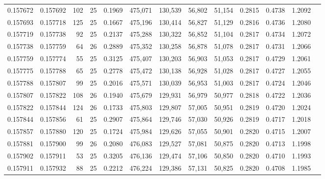 \begin{tabular}{rrrrrrrrrrrrr}
0.157672 & 0.157692 &   102 &  25 &                                     0.1969 & 475,071 & 130,539 &  56,802 &  51,154 & 0.2815 & 0.4738 & 1.2092 \\
0.157693 & 0.157718 &   125 &  25 &                                     0.1667 & 475,196 & 130,414 &  56,827 &  51,129 & 0.2816 & 0.4736 & 1.2080 \\
0.157719 & 0.157738 &    92 &  25 &                                     0.2137 & 475,288 & 130,322 &  56,852 &  51,104 & 0.2817 & 0.4734 & 1.2072 \\
0.157738 & 0.157759 &    64 &  26 &                                     0.2889 & 475,352 & 130,258 &  56,878 &  51,078 & 0.2817 & 0.4731 & 1.2066 \\
0.157759 & 0.157774 &    55 &  25 &                                     0.3125 & 475,407 & 130,203 &  56,903 &  51,053 & 0.2817 & 0.4729 & 1.2061 \\
0.157775 & 0.157788 &    65 &  25 &                                     0.2778 & 475,472 & 130,138 &  56,928 &  51,028 & 0.2817 & 0.4727 & 1.2055 \\
0.157788 & 0.157807 &    99 &  25 &                                     0.2016 & 475,571 & 130,039 &  56,953 &  51,003 & 0.2817 & 0.4724 & 1.2046 \\
0.157807 & 0.157822 &   108 &  26 &                                     0.1940 & 475,679 & 129,931 &  56,979 &  50,977 & 0.2818 & 0.4722 & 1.2036 \\
0.157822 & 0.157844 &   124 &  26 &                                     0.1733 & 475,803 & 129,807 &  57,005 &  50,951 & 0.2819 & 0.4720 & 1.2024 \\
0.157844 & 0.157856 &    61 &  25 &                                     0.2907 & 475,864 & 129,746 &  57,030 &  50,926 & 0.2819 & 0.4717 & 1.2018 \\
0.157857 & 0.157880 &   120 &  25 &                                     0.1724 & 475,984 & 129,626 &  57,055 &  50,901 & 0.2820 & 0.4715 & 1.2007 \\
0.157881 & 0.157900 &    99 &  26 &                                     0.2080 & 476,083 & 129,527 &  57,081 &  50,875 & 0.2820 & 0.4713 & 1.1998 \\
0.157902 & 0.157911 &    53 &  25 &                                     0.3205 & 476,136 & 129,474 &  57,106 &  50,850 & 0.2820 & 0.4710 & 1.1993 \\
0.157911 & 0.157932 &    88 &  25 &                                     0.2212 & 476,224 & 129,386 &  57,131 &  50,825 & 0.2820 & 0.4708 & 1.1985 \\

\end{tabular}
